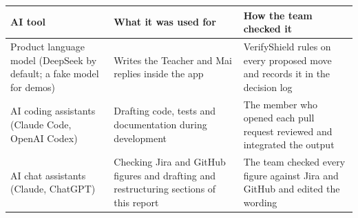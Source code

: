 \documentclass[11pt,a4paper]{article}
\begin{document}
{\small
\begin{longtable}{>{\raggedright\arraybackslash}p{}>{\raggedright\arraybackslash}p{}>{\raggedright\arraybackslash}p{}}
\toprule
\textbf{AI tool} & \textbf{What it was used for} & \textbf{How the team checked it} \\
\midrule
\endhead
Product language model (DeepSeek by default; a fake model for demos) & Writes the Teacher and Mai replies inside the app & VerifyShield rules on every proposed move and records it in the decision log \\
AI coding assistants (Claude Code, OpenAI Codex) & Drafting code, tests and documentation during development & The member who opened each pull request reviewed and integrated the output \\
AI chat assistants (Claude, ChatGPT) & Checking Jira and GitHub figures and drafting and restructuring sections of this report & The team checked every figure against Jira and GitHub and edited the wording \\
\bottomrule
\end{longtable}}
\end{document}

